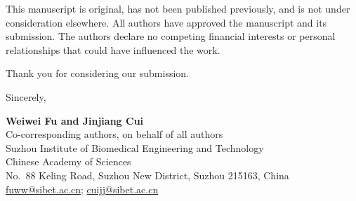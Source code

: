 \documentclass[11pt]{article}
\begin{document}
This manuscript is original, has not been published previously, and is
not under consideration elsewhere. All authors have approved the
manuscript and its submission. The authors declare no competing
financial interests or personal relationships that could have
influenced the work.

Thank you for considering our submission.

Sincerely,

\textbf{Weiwei Fu and Jinjiang Cui}\\
Co-corresponding authors, on behalf of all authors\\
Suzhou Institute of Biomedical Engineering and Technology\\
Chinese Academy of Sciences\\
No.\ 88 Keling Road, Suzhou New District, Suzhou 215163, China\\
\href{mailto:fuww@sibet.ac.cn}{fuww@sibet.ac.cn};
\href{mailto:cuijj@sibet.ac.cn}{cuijj@sibet.ac.cn}
\end{document}
